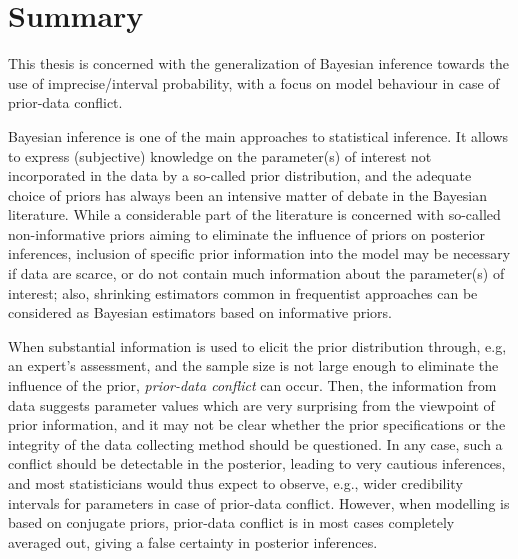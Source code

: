 
\chapter*{Summary}

This thesis is concerned with the generalization of Bayesian inference towards the use of imprecise/interval probability,
with a focus on model behaviour in case of prior-data conflict.

Bayesian inference is one of the main approaches to statistical inference.
It allows to express (subjective) knowledge on the parameter(s) of interest not incorporated in the data by a so-called prior distribution,
and the adequate choice of priors has always been an intensive matter of debate in the Bayesian literature.
While a considerable part of the literature is concerned with so-called non-informative priors aiming to eliminate the influence of priors on posterior inferences,
inclusion of specific prior information into the model may be necessary if data are scarce,
or do not contain much information about the parameter(s) of interest;
also, shrinking estimators common in frequentist approaches can be considered as Bayesian estimators based on informative priors.

When substantial information is used to elicit the prior distribution through, e.g, an expert's assessment,
and the sample size is not large enough to eliminate the influence of the prior, \emph{prior-data conflict} can occur.
Then, the information from data suggests parameter values which are very surprising from the viewpoint of prior information,
and it may not be clear whether the prior specifications or the integrity of the data collecting method should be questioned.
In any case, such a conflict should be detectable in the posterior, leading to very cautious inferences,
and most statisticians would thus expect to observe, e.g., wider credibility intervals for parameters in case of prior-data conflict.
However, when modelling is based on conjugate priors, prior-data conflict is in most cases completely averaged out,
giving a false certainty in posterior inferences.

%
%
%

